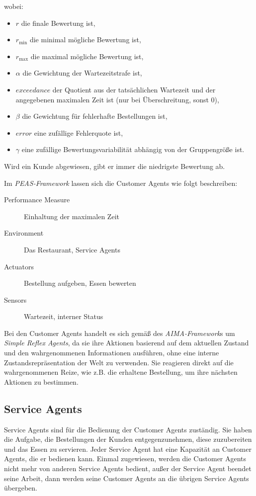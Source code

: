 wobei:
\begin{itemize}
    \item $r$ die finale Bewertung ist,
    \item $r_{\text{min}}$ die minimal mögliche Bewertung ist,
    \item $r_{\text{max}}$ die maximal mögliche Bewertung ist,
    \item $\alpha$ die Gewichtung der Wartezeitstrafe ist,
    \item $exceedance$ der Quotient aus der tatsächlichen Wartezeit und der angegebenen maximalen Zeit ist (nur bei Überschreitung, sonst 0),
    \item $\beta$ die Gewichtung für fehlerhafte Bestellungen ist,
    \item $error$ eine zufällige Fehlerquote ist,
    \item $\gamma$ eine zufällige Bewertungsvariabilität abhängig von der Gruppengröße ist.
\end{itemize}

Wird ein Kunde abgewiesen, gibt er immer die niedrigste Bewertung ab.

Im \emph{PEAS-Framework} lassen sich die Customer Agents wie folgt beschreiben:
\begin{description}
    \item[Performance Measure] Einhaltung der maximalen Zeit
    \item[Environment] Das Restaurant, Service Agents
    \item[Actuators] Bestellung aufgeben, Essen bewerten
    \item[Sensors] Wartezeit, interner Status
\end{description}

Bei den Customer Agents handelt es sich gemäß des \emph{AIMA-Framework}s um \emph{Simple Reflex Agents}, da sie ihre Aktionen basierend auf dem aktuellen Zustand und den wahrgenommenen Informationen ausführen, ohne eine interne Zustandsrepräsentation der Welt zu verwenden. Sie reagieren direkt auf die wahrgenommenen Reize, wie z.B. die erhaltene Bestellung, um ihre nächsten Aktionen zu bestimmen.


\subsection{Service Agents}
\label{subsec:service_agents}
Service Agents sind für die Bedienung der Customer Agents zuständig. Sie haben die Aufgabe, die Bestellungen der Kunden entgegenzunehmen, diese zuzubereiten und das Essen zu servieren. Jeder Service Agent hat eine Kapazität an Customer Agents, die er bedienen kann. Einmal zugewiesen, werden die Customer Agents nicht mehr von anderen Service Agents bedient, außer der Service Agent beendet seine Arbeit, dann werden seine Customer Agents an die übrigen Service Agents übergeben.

